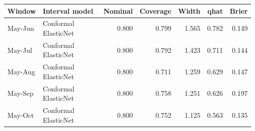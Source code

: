 \begin{tabular}{llrrrrr}
\toprule
Window & Interval model & Nominal & Coverage & Width & qhat & Brier \\
\midrule
May-Jun & Conformal ElasticNet & 0.800 & 0.799 & 1.565 & 0.782 & 0.149 \\
May-Jul & Conformal ElasticNet & 0.800 & 0.792 & 1.423 & 0.711 & 0.144 \\
May-Aug & Conformal ElasticNet & 0.800 & 0.711 & 1.259 & 0.629 & 0.147 \\
May-Sep & Conformal ElasticNet & 0.800 & 0.758 & 1.251 & 0.626 & 0.197 \\
May-Oct & Conformal ElasticNet & 0.800 & 0.752 & 1.125 & 0.563 & 0.135 \\
\bottomrule
\end{tabular}
